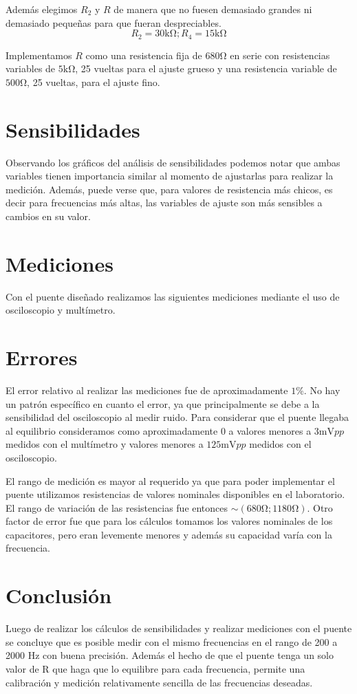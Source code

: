 Además elegimos $R_2$ y $R$ de manera que no fuesen demasiado grandes ni demasiado
pequeñas para que fueran despreciables.
\begin{equation}
    R_2 = 30\si{\kilo\ohm}; R_4=15\si{\kilo\ohm}
\end{equation}

Implementamos $R$ como una resistencia fija de $680\si{\ohm}$ en serie con resistencias
variables de $5\si{\kilo\ohm}$, 25 vueltas para el ajuste grueso y una resistencia variable
de $500\si{\ohm}$, 25 vueltas, para el ajuste fino.

\section{Sensibilidades}

Observando los gráficos del análisis de sensibilidades podemos notar que ambas variables 
tienen importancia similar al momento de ajustarlas para realizar la medición. Además, 
puede verse que, para valores de resistencia más chicos, es decir para frecuencias más altas, 
las variables de ajuste son más sensibles a cambios en su valor.

\section{Mediciones}
Con el puente diseñado realizamos las siguientes mediciones mediante el uso de osciloscopio
y multímetro.

\section{Errores}
El error relativo al realizar las mediciones fue de aproximadamente $1 \% $. No hay un 
patrón específico en cuanto el error, ya que principalmente se debe a la sensibilidad del 
osciloscopio al medir ruido. Para considerar que el puente llegaba al equilibrio consideramos 
como aproximadamente 0 a valores menores a $3\si{\milli\volt}pp$ medidos con el multímetro y valores menores a 
$125\si{\milli\volt}pp$ medidos con el osciloscopio.

El rango de medición es mayor al requerido ya que para poder implementar el puente utilizamos 
resistencias de valores nominales disponibles en el laboratorio. El rango de variación de las 
resistencias fue entonces $\sim (680 \si{\ohm}; 1180 \si{\ohm})$. Otro factor de error fue que
para los cálculos tomamos los valores nominales de los capacitores, pero eran levemente 
menores y además su capacidad varía con la frecuencia.


\section{Conclusión}

Luego de realizar los cálculos de sensibilidades y realizar mediciones con el puente se concluye que es posible medir con el mismo frecuencias en el rango de 200 a  2000 Hz con buena precisión. Además el hecho de que el puente tenga un solo valor de R que haga que lo equilibre para cada frecuencia, permite una calibración y medición relativamente sencilla de las frecuencias deseadas.